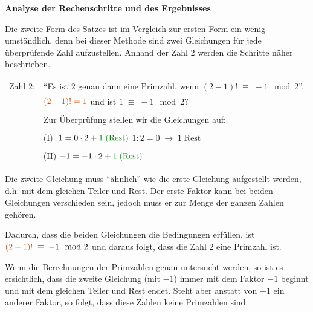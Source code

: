 \textbf{Analyse der Rechenschritte und des Ergebnisses}

Die zweite Form des Satzes ist im Vergleich zur ersten Form
ein wenig umständlich, denn bei dieser Methode sind zwei
Gleichungen für jede überprüfende Zahl aufzustellen.
Anhand der Zahl $2$ werden die Schritte näher beschrieben.

\begin{table}[H]
 \begin{tabular}{p{2.5cm} l}
  Zahl $2$:
  & ``Es ist $2$ genau dann eine Primzahl,
     wenn $(2-1)! \;\equiv\; -1 \mod 2$''. \\
  & ${\color{DarkOrange} (2-1)! = 1}$ und ist $1 \;\equiv\; -1 \mod 2$? \\
  & \\
  & Zur Überprüfung stellen wir die Gleichungen auf: \\
  & \\
  & (I) $\;1 = 0 \cdot 2 + {\color{DarkGreen} 1 \;\text{(Rest)}}$
  \hspace{.8cm} $1 : 2 = 0 \;\rightarrow\; 1 \; \text{Rest}$ \\
  & \\
  & (II) $-1 = -1 \cdot 2 + {\color{DarkGreen} 1 \;\text{(Rest)}}$ \\
 \end{tabular}
\end{table}

Die zweite Gleichung muss ``ähnlich'' wie die erste
Gleichung aufgestellt werden, d.h. mit dem gleichen
Teiler und Rest. Der erste Faktor kann bei beiden
Gleichungen verschieden sein, jedoch muss er zur
Menge der ganzen Zahlen gehören.

Dadurch, dass die beiden Gleichungen die Bedingungen
erfüllen, ist ${\color{DarkOrange}(2-1)!} \;\equiv\; -1 \mod 2$ und
daraus folgt, dass die Zahl $2$ eine Primzahl ist.

Wenn die Berechnungen der Primzahlen genau untersucht
werden, so ist es ersichtlich, dass die zweite Gleichung
(mit $-1$) immer mit dem Faktor $-1$ beginnt und mit
dem gleichen Teiler und Rest endet. Steht aber anstatt
von $-1$ ein anderer Faktor, so folgt, dass diese
Zahlen keine Primzahlen sind.
